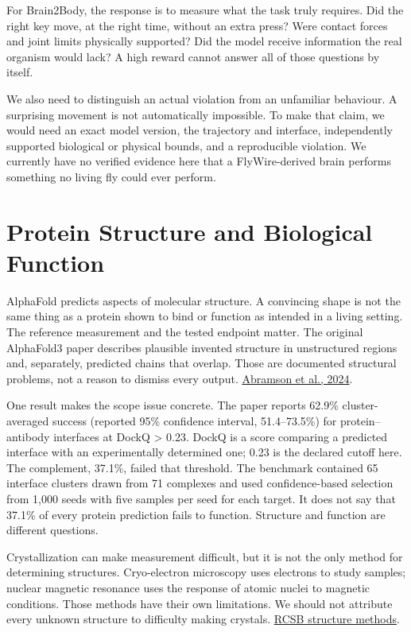 For Brain2Body, the response is to measure what the task truly requires. Did the right key move, at the right time, without an extra press? Were contact forces and joint limits physically supported? Did the model receive information the real organism would lack? A high reward cannot answer all of those questions by itself.\par

We also need to distinguish an actual violation from an unfamiliar behaviour. A surprising movement is not automatically impossible. To make that claim, we would need an exact model version, the trajectory and interface, independently supported biological or physical bounds, and a reproducible violation. We currently have no verified evidence here that a FlyWire-derived brain performs something no living fly could ever perform.\par

\section{Protein Structure and Biological Function}

AlphaFold predicts aspects of molecular structure. A convincing shape is not the same thing as a protein shown to bind or function as intended in a living setting. The reference measurement and the tested endpoint matter. The original AlphaFold3 paper describes plausible invented structure in unstructured regions and, separately, predicted chains that overlap. Those are documented structural problems, not a reason to dismiss every output. \href{https://www.nature.com/articles/s41586-024-07487-w}{Abramson et al., 2024}.\par

One result makes the scope issue concrete. The paper reports 62.9\% cluster-averaged success (reported 95\% confidence interval, 51.4--73.5\%) for protein--antibody interfaces at DockQ > 0.23. DockQ is a score comparing a predicted interface with an experimentally determined one; 0.23 is the declared cutoff here. The complement, 37.1\%, failed that threshold. The benchmark contained 65 interface clusters drawn from 71 complexes and used confidence-based selection from 1,000 seeds with five samples per seed for each target. It does not say that 37.1\% of every protein prediction fails to function. Structure and function are different questions.\par

Crystallization can make measurement difficult, but it is not the only method for determining structures. Cryo-electron microscopy uses electrons to study samples; nuclear magnetic resonance uses the response of atomic nuclei to magnetic conditions. Those methods have their own limitations. We should not attribute every unknown structure to difficulty making crystals. \href{https://pdb101.rcsb.org/learn/guide-to-understanding-pdb-data/methods-for-determining-structure}{RCSB structure methods}.\par

